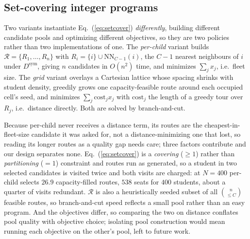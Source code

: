 \documentclass[graybox]{SNmult}
\begin{document}
\subsection{Set-covering integer programs}\label{sec:setcover-two}
Two variants instantiate Eq.~(\ref{eq:setcover}) \emph{differently},
building different candidate pools and optimizing different objectives, so
they are two policies rather than two implementations of one. The
\emph{per-child} variant builds
$\mathcal{R}=\{R_1,\dots,R_n\}$ with $R_i=\{i\}\cup\mathrm{NN}_{C-1}(i)$,
the $C-1$ nearest neighbours of $i$ under $D^{\mathrm{sym}}$, giving $n$
candidates in $O(n^2)$ time, and minimizes $\sum_j x_j$, i.e.\ fleet size.
The \emph{grid} variant overlays a Cartesian lattice whose spacing shrinks
with student density, greedily grows one capacity-feasible route around
each occupied cell's seed, and minimizes
$\sum_j \mathrm{cost}_j x_j$ with $\mathrm{cost}_j$ the length of a greedy
tour over $R_j$, i.e.\ distance directly. Both are solved by
branch-and-cut.

Because per-child never receives a distance term, its routes are the
cheapest-in-fleet-size candidate it was asked for, not a
distance-minimizing one that lost, so reading its longer routes as a
quality gap needs care; three factors contribute and our design separates
none. Eq.~(\ref{eq:setcover}) is a \emph{covering} ($\ge1$) rather than
\emph{partitioning} ($=1$) constraint and routes run as generated, so a
student in two selected candidates is visited twice and both visits are
charged: at $N=400$ per-child selects $26.9$ capacity-filled routes, $538$
seats for $400$ students, about a quarter of visits redundant.
$\mathcal{R}$ is also a heuristically seeded subset of all
$\binom{n}{\le C}$ feasible routes, so branch-and-cut speed reflects a
small pool rather than an easy program. And the objectives differ, so
comparing the two on distance conflates pool quality with objective
choice; isolating pool construction would mean running each objective on
the other's pool, left to future work.
\end{document}
